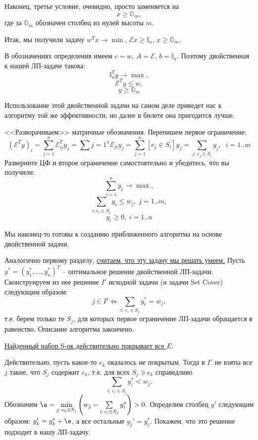 Наконец, третье условие, очевидно, просто заменяется на $$x \geq \mathbb{O}_m,$$ где за $\mathbb{O}_m$ обозначен столбец из нулей высоты $m$.

Итак, мы получили задачу $w^Tx \rightarrow \min$, $\mathcal{E} x \geq \mathbb{I}_n$, $x \geq \mathbb{O}_m$. 


В обозначениях определения имеем $c = w$, $A = \mathcal E$, $b = \mathbb{I}_n$. Поэтому двойственная к нашей ЛП-задаче такова: 
$$\mathbb{I}_n^Ty \rightarrow \max,$$
$$\mathcal{E}^T y \leq w,$$
$$y \geq \mathbb{O}_m$$

Использование этой двойственной задачи на самом деле приведет нас к алгоритму той же эффективности, но далее в билете она пригодится лучше. 

<<Разворачиваем>> матричные обозначения. Перепишем первое ограничение:
$$(\mathcal{E}^Ty)_i = \sum_{j=1}^n\mathcal{E}^T_{ij}y_j = \sum{j=1}^n\mathcal{E}_{ji}y_j = \sum_{j=1}^n [e_j \in S_i] y_j = \sum_{j:\, e_j \in S_i} y_j, \;\; i=1..m$$
Разверните ЦФ и второе ограничение самостоятельно и убедитесь, что вы получили:
$$\sum_{j=1}^n y_j \rightarrow\max,$$
$$\sum_{i: e_i \in S_j} y_i\leq w_j, \; j=1..m,$$
$$y_i \geq 0, \; i=1..n$$

Мы наконец-то готовы к созданию приближенного алгоритма на основе двойственной задачи. 


Аналогично первому разделу, \underline{считаем, что эту задачу мы решать умеем.} Пусть $y^* = (y_1^*, ..., y_n^*)^T$ -- оптимальное решение двойственной ЛП-задачи. Сконструируем из нее решение $I'$ исходной задачи (и задачи Set Cover) следующим образом:
$$j \in I' \iff \sum_{i:\, e_i \in S_j}y_i^* = w_j,$$
т.е. берем только те $S_j$, для которых первое ограничение ЛП-задачи обращается в равенство.
Описание алгоритма закончено.

\underline{Найденный набор S-ок действительно покрывает все $E$}.

Действительно, пусть какое-то $e_k$ оказалось не покрытым. Тогда в $I'$ не взяты все $j$ такие, что $S_j$ содержит $e_k$, т.е. для всех $S_j \ni e_k$ справедливо $$\sum_{i:\, e_i \in S_j}y_i^* < w_j.$$
Обозначим $\e = \min\limits_{j:\, e_k \in S_j} \left(w_j - \sum\limits_{i:\, e_i \in S_j}y_i^*\right) > 0$. Определим столбец $y'$ следующим образом: $y_k' = y_k^* + \e$, а все остальные $y_j' = y_j^*$. Покажем, что это решение подходит в нашу ЛП-задачу. 

